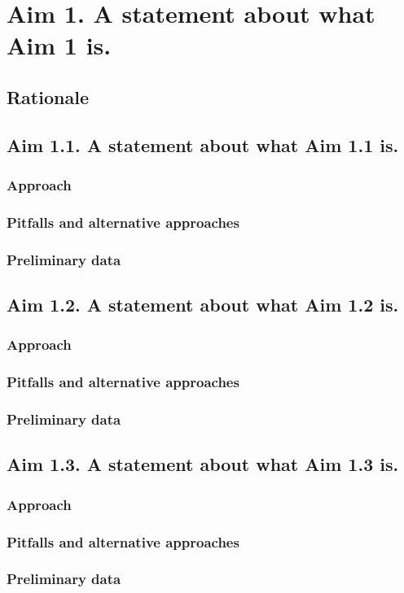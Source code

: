 \section*{Aim 1. A statement about what Aim 1 is.}

\subsection*{Rationale}

\subsection*{Aim 1.1. A statement about what Aim 1.1 is.}

\subsubsection*{Approach}

\subsubsection*{Pitfalls and alternative approaches}

\subsubsection*{Preliminary data}

\subsection*{Aim 1.2. A statement about what Aim 1.2 is.}

\subsubsection*{Approach}

\subsubsection*{Pitfalls and alternative approaches}

\subsubsection*{Preliminary data}

\subsection*{Aim 1.3. A statement about what Aim 1.3 is.}

\subsubsection*{Approach}

\subsubsection*{Pitfalls and alternative approaches}

\subsubsection*{Preliminary data}

